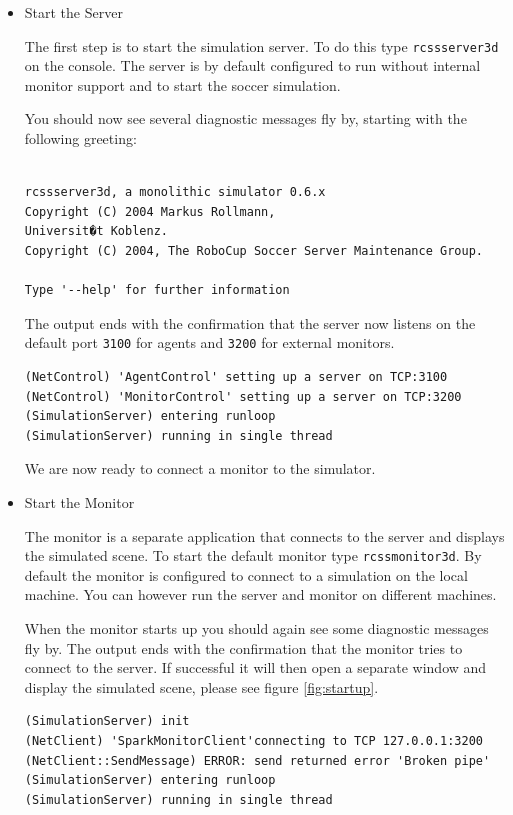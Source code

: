 \begin{itemize}
\item{Start the Server}

The first step is to start the simulation server. To do this type
\texttt{rcssserver3d} on the console. The server is by default configured
to run without internal monitor support and to start the soccer
simulation. 

You should now see several diagnostic messages fly by, starting with
the following greeting:

\begin{verbatim}

rcssserver3d, a monolithic simulator 0.6.x
Copyright (C) 2004 Markus Rollmann,
Universit�t Koblenz.
Copyright (C) 2004, The RoboCup Soccer Server Maintenance Group.

Type '--help' for further information

\end{verbatim}

The output ends with the confirmation that the server now listens on
the default port \texttt{3100} for agents and \texttt{3200} for
external monitors.

\begin{verbatim}
(NetControl) 'AgentControl' setting up a server on TCP:3100
(NetControl) 'MonitorControl' setting up a server on TCP:3200
(SimulationServer) entering runloop
(SimulationServer) running in single thread
\end{verbatim}

We are now ready to connect a monitor to the simulator.


\item{Start the Monitor}

The monitor is a separate application that connects to the server and
displays the simulated scene. To start the default monitor type
\texttt{rcssmonitor3d}. By default the monitor is configured to connect to a simulation 
on the local machine. You can however run the server and monitor on
different machines.

When the monitor starts up you should again see some diagnostic
messages fly by. The output ends with the confirmation that the
monitor tries to connect to the server. If successful it will then open
a separate window and display the simulated scene, please see figure
\ref{fig:startup}.

\begin{verbatim}
(SimulationServer) init
(NetClient) 'SparkMonitorClient'connecting to TCP 127.0.0.1:3200
(NetClient::SendMessage) ERROR: send returned error 'Broken pipe'
(SimulationServer) entering runloop
(SimulationServer) running in single thread
\end{verbatim}


\end{itemize}
